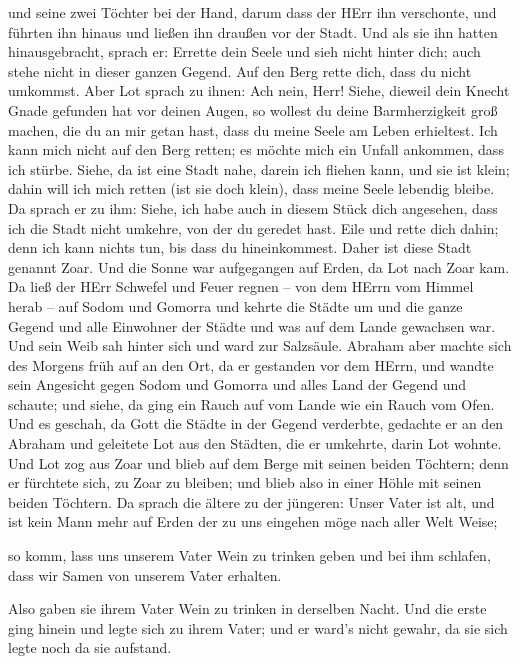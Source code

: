 und seine zwei Töchter bei der Hand, darum dass der HErr ihn verschonte,
und führten ihn hinaus und ließen ihn draußen vor der Stadt.
 Und als sie ihn hatten hinausgebracht, sprach er: Errette
dein Seele und sieh nicht hinter dich; auch stehe nicht in dieser ganzen
Gegend. Auf den Berg rette dich, dass du nicht umkommst. 
Aber Lot sprach zu ihnen: Ach nein, Herr!  Siehe, dieweil
dein Knecht Gnade gefunden hat vor deinen Augen, so wollest du deine
Barmherzigkeit groß machen, die du an mir getan hast, dass du meine
Seele am Leben erhieltest. Ich kann mich nicht auf den Berg retten; es
möchte mich ein Unfall ankommen, dass ich stürbe.  Siehe,
da ist eine Stadt nahe, darein ich fliehen kann, und sie ist klein;
dahin will ich mich retten (ist sie doch klein), dass meine Seele
lebendig bleibe.  Da sprach er zu ihm: Siehe, ich habe auch
in diesem Stück dich angesehen, dass ich die Stadt nicht umkehre, von
der du geredet hast.  Eile und rette dich dahin; denn ich
kann nichts tun, bis dass du hineinkommest. Daher ist diese Stadt
genannt Zoar.  Und die Sonne war aufgegangen auf Erden, da
Lot nach Zoar kam.  Da ließ der HErr Schwefel und Feuer
regnen -- von dem HErrn vom Himmel herab -- auf Sodom und Gomorra
 und kehrte die Städte um und die ganze Gegend und alle
Einwohner der Städte und was auf dem Lande gewachsen war. 
Und sein Weib sah hinter sich und ward zur Salzsäule. 
Abraham aber machte sich des Morgens früh auf an den Ort, da er
gestanden vor dem HErrn,  und wandte sein Angesicht gegen
Sodom und Gomorra und alles Land der Gegend und schaute; und siehe, da
ging ein Rauch auf vom Lande wie ein Rauch vom Ofen.  Und
es geschah, da Gott die Städte in der Gegend verderbte, gedachte er an
den Abraham und geleitete Lot aus den Städten, die er umkehrte, darin
Lot wohnte.  Und Lot zog aus Zoar und blieb auf dem Berge
mit seinen beiden Töchtern; denn er fürchtete sich, zu Zoar zu bleiben;
und blieb also in einer Höhle mit seinen beiden Töchtern. 
Da sprach die ältere zu der jüngeren: Unser Vater ist alt, und ist kein
Mann mehr auf Erden der zu uns eingehen möge nach aller Welt Weise;

 so komm, lass uns unserem Vater Wein zu trinken geben und
bei ihm schlafen, dass wir Samen von unserem Vater erhalten.

 Also gaben sie ihrem Vater Wein zu trinken in derselben
Nacht. Und die erste ging hinein und legte sich zu ihrem Vater; und er
ward's nicht gewahr, da sie sich legte noch da sie aufstand.

